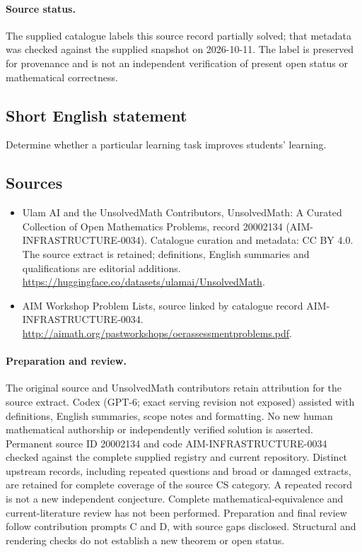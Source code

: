 \documentclass[11pt]{article}
\begin{document}
\paragraph{Source status.}
The supplied catalogue labels this source record partially solved; that metadata was checked against the supplied snapshot on 2026-10-11. The label is preserved for provenance and is not an independent verification of present open status or mathematical correctness.
\subsection{Short English statement}
Determine whether a particular learning task improves students' learning.
\subsection{Sources}
\begin{itemize}
\item[\hypertarget{source:20002134:1}{S1}] Ulam AI and the UnsolvedMath Contributors, UnsolvedMath: A Curated Collection of Open Mathematics Problems, record 20002134 (AIM-INFRASTRUCTURE-0034). Catalogue curation and metadata: CC BY 4.0. The source extract is retained; definitions, English summaries and qualifications are editorial additions.
\url{https://huggingface.co/datasets/ulamai/UnsolvedMath}.
\item[\hypertarget{source:20002134:2}{S2}] AIM Workshop Problem Lists, source linked by catalogue record AIM-INFRASTRUCTURE-0034.
\url{http://aimath.org/pastworkshops/oerassessmentproblems.pdf}.
\end{itemize}
\paragraph{Preparation and review.}
The original source and UnsolvedMath contributors retain attribution for the source extract. Codex (GPT-6; exact serving revision not exposed) assisted with definitions, English summaries, scope notes and formatting. No new human mathematical authorship or independently verified solution is asserted. Permanent source ID 20002134 and code AIM-INFRASTRUCTURE-0034 checked against the complete supplied registry and current repository. Distinct upstream records, including repeated questions and broad or damaged extracts, are retained for complete coverage of the source CS category. A repeated record is not a new independent conjecture. Complete mathematical-equivalence and current-literature review has not been performed. Preparation and final review follow contribution prompts C and D, with source gaps disclosed. Structural and rendering checks do not establish a new theorem or open status.
\label{end:20002134}
\end{document}
